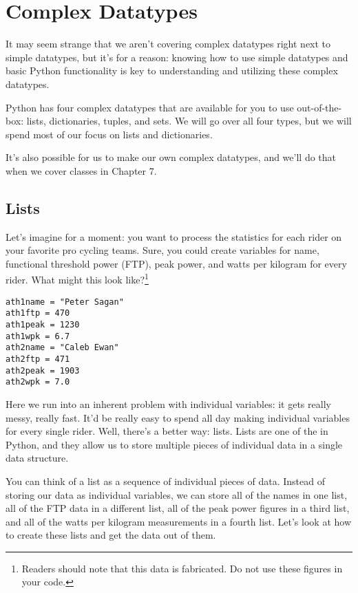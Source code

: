 \chapter{Complex Datatypes}
It may seem strange that we aren't covering complex datatypes right next to simple datatypes, but it's for a reason: knowing how to use simple datatypes and basic Python functionality is key to understanding and utilizing these complex datatypes.\par
Python has four complex datatypes that are available for you to use out-of-the-box: lists, dictionaries, tuples, and sets. We will go over all four types, but we will spend most of our focus on lists and dictionaries.\par
It's also possible for us to make our own complex datatypes, and we'll do that when we cover classes in Chapter 7.
\section{Lists}
Let's imagine for a moment: you want to process the statistics for each rider on your favorite pro cycling teams. Sure, you could create variables for name, functional threshold power (FTP), peak power, and watts per kilogram for every rider. What might this look like?\footnote{Readers should note that this data is fabricated. Do not use these figures in your code.}\par
\begin{lstlisting}[style=pippython]
ath1name = "Peter Sagan"
ath1ftp = 470
ath1peak = 1230
ath1wpk = 6.7
ath2name = "Caleb Ewan"
ath2ftp = 471
ath2peak = 1903
ath2wpk = 7.0
\end{lstlisting}
Here we run into an inherent problem with individual variables: it gets really messy, really fast. It'd be really easy to spend all day making individual variables for every single rider. Well, there's a better way: lists. Lists are one of the  in Python, and they allow us to store multiple pieces of individual data in a single data structure.\par
You can think of a list as a sequence of individual pieces of data. Instead of storing our data as individual variables, we can store all of the names in one list, all of the FTP data in a different list, all of the peak power figures in a third list, and all of the watts per kilogram measurements in a fourth list. Let's look at how to create these lists and get the data out of them.\par
